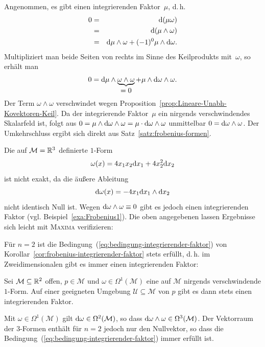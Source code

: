 \begin{svmultproof2}
Angenommen, es gibt einen integrierenden Faktor~$\mu$, d.\,h. 
\begin{eqnarray*}
0 & = & {\mathrm{d}}(\mu\omega)\\
 & = & {\mathrm{d}}(\mu\wedge\omega)\\
 & = & {\mathrm{d}}\mu\wedge\omega+(-1)^{0}\mu\wedge{\mathrm{d}}\omega.
\end{eqnarray*}
Multipliziert man beide Seiten von rechts im Sinne des Keilprodukts
mit~$\omega$, so erhält man 
\[
0={\mathrm{d}}\mu\wedge\underbrace{\omega\wedge\omega}_{{\displaystyle =0}}+\mu\wedge{\mathrm{d}}\omega\wedge\omega.
\]
Der Term $\omega\wedge\omega$ verschwindet wegen Proposition~\ref{prop:Lineare-Unabh-Kovektoren-Keil}.
Da der integrierende Faktor~$\mu$ ein nirgends verschwindendes Skalarfeld
ist, folgt aus $0=\mu\wedge{\mathrm{d}}\omega\wedge\omega=\mu\cdot{\mathrm{d}}\omega\wedge\omega$
unmittelbar $0={\mathrm{d}}\omega\wedge\omega$. Der Umkehrschluss ergibt sich
direkt aus Satz~\ref{satz:frobenius-formen}.
\end{svmultproof2}

\begin{example}
\label{exa:Fobenius2}Die auf $\mathcal{M}={\mathbb{R}}^{3}$ definierte $1$-Form
\[
\omega(x)=4x_{1}x_{2}{\mathrm{d}} x_{1}+4x_{2}^{2}{\mathrm{d}} x_{2}
\]
 ist nicht exakt, da die äußere Ableitung 
\[
\mathrm{d}\omega(x)=-4x_{1}\mathrm{d} x_{1}\wedge\mathrm{d} x_{2}
\]
nicht identisch Null ist. Wegen ${\mathrm{d}}\omega\wedge\omega\equiv0$ gibt
es jedoch einen integrierenden Faktor (vgl. Beispiel~\ref{exa:Frobenius1}).
Die oben angegebenen lassen Ergebnisse sich leicht mit \textsc{Maxima}
verifizieren:
\end{example}
\begin{maxima}\end{maxima}

Für $n=2$ ist die Bedingung~(\ref{eq:bedingung-integrierender-faktor})
von Korollar~\ref{cor:frobenius-integrierender-faktor} stets erfüllt,
d.\,h. im Zweidimensionalen gibt es immer einen integrierenden Faktor:
\begin{corollary}
\label{cor:frobenius-integrierender-faktor-n-2}Sei $\mathcal{M}\subseteq{\mathbb{R}}^{2}$
offen, $p\in\mathcal{M}$ und $\omega\in\Omega^{1}(\mathcal{M})$
eine auf $\mathcal{M}$ nirgends verschwindende $1$-Form. Auf einer
geeigneten Umgebung $\mathcal{U\subseteq\mathcal{M}}$ von $p$ gibt
es dann stets einen integrierenden Faktor.
\end{corollary}
\begin{svmultproof2}
Mit $\omega\in\Omega^{1}(\mathcal{M})$ gilt $\mathrm{d}\omega\in\Omega^{2}(\mathcal{M})$,
so dass ${\mathrm{d}}\omega\wedge\omega\in\Omega^{3}(\mathcal{M})$. Der Vektorraum
der $3$-Formen enthält für $n=2$ jedoch nur den Nullvektor, so dass
die Bedingung~(\ref{eq:bedingung-integrierender-faktor}) immer erfüllt
ist.
\end{svmultproof2}


